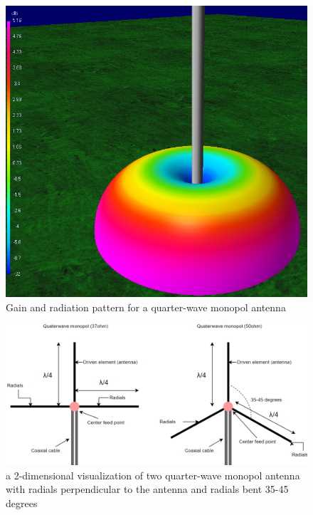 \begin{figure}[h]
\centering
\includegraphics[scale=0.50]{figures/quaterwaveMonoplAntenna.PNG}
\caption{Gain and radiation pattern for a quarter-wave monopol antenna}
\end{figure}

\begin{figure}[h]
\hspace{-1cm}
\includegraphics[scale=0.55]{figures/QuaterWaveMonopolAntennaRadials.PNG}
\caption{a 2-dimensional visualization of two quarter-wave monopol antenna with radials perpendicular to the antenna and radials bent 35-45 degrees}
\end{figure}

\newpage

